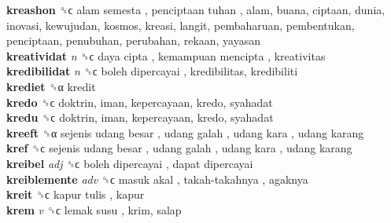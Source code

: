\textbf{kreashon} ␝ϲ   alam semesta ,  penciptaan tuhan , alam, buana, ciptaan, dunia, inovasi, kewujudan, kosmos, kreasi, langit, pembaharuan, pembentukan, penciptaan, penubuhan, perubahan, rekaan, yayasan  \\
\textbf{kreatividat} \emph{n}  ␝ϲ   daya cipta ,  kemampuan mencipta , kreativitas  \\
\textbf{kredibilidat} \emph{n}  ␝ϲ   boleh dipercayai , kredibilitas, kredibiliti  \\
\textbf{krediet} ␝α  kredit  \\
\textbf{kredo} ␝ϲ  doktrin, iman, kepercayaan, kredo, syahadat  \\
\textbf{kredu} ␝ϲ  doktrin, iman, kepercayaan, kredo, syahadat  \\
\textbf{kreeft} ␝α   sejenis udang besar ,  udang galah ,  udang kara ,  udang karang   \\
\textbf{kref} ␝ϲ   sejenis udang besar ,  udang galah ,  udang kara ,  udang karang   \\
\textbf{kreibel} \emph{adj}  ␝ϲ   boleh dipercayai ,  dapat dipercayai   \\
\textbf{kreiblemente} \emph{adv}  ␝ϲ   masuk akal ,  takah-takahnya , agaknya  \\
\textbf{kreit} ␝ϲ   kapur tulis , kapur  \\
\textbf{krem} \emph{v}  ␝ϲ   lemak susu , krim, salap  \\
